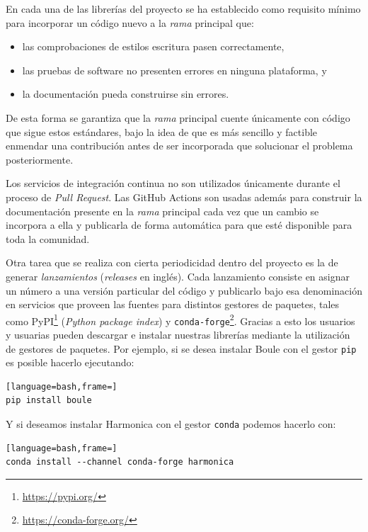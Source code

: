 En cada una de las librerías del proyecto se ha establecido como requisito
mínimo para incorporar un código nuevo a la \emph{rama} principal que:

\begin{itemize}
    \item las comprobaciones de estilos escritura pasen correctamente,
    \item las pruebas de software no presenten errores en ninguna plataforma, y
    \item la documentación pueda construirse sin errores.
\end{itemize}

De esta forma se garantiza que la \emph{rama} principal cuente únicamente con
código que sigue estos estándares, bajo la idea de que es más sencillo
y factible enmendar una contribución antes de ser incorporada que solucionar el
problema posteriormente.

Los servicios de integración continua no son utilizados únicamente durante el
proceso de \emph{Pull Request}.
Las GitHub Actions son usadas además para construir la documentación presente
en la \emph{rama} principal cada vez que un cambio se incorpora a ella
y publicarla de forma automática para que esté disponible para toda la
comunidad.

Otra tarea que se realiza con cierta periodicidad dentro del proyecto es la de
generar \emph{lanzamientos} (\emph{releases} en inglés).
Cada lanzamiento consiste en asignar un número a una versión particular del
código y publicarlo bajo esa denominación en servicios que proveen las fuentes
para distintos gestores de paquetes, tales como
PyPI\footnote{\url{https://pypi.org/}} (\emph{Python package index})
y \texttt{conda-forge}\footnote{\url{https://conda-forge.org/}}.
Gracias a esto los usuarios y usuarias pueden descargar e instalar nuestras
librerías mediante la utilización de gestores de paquetes.
Por ejemplo, si se desea instalar Boule con el gestor \texttt{pip} es posible
hacerlo ejecutando:

\begin{lstlisting}[language=bash,frame=]
pip install boule
\end{lstlisting}

\noindent Y si deseamos instalar Harmonica con el gestor \texttt{conda} podemos
hacerlo con:

\begin{lstlisting}[language=bash,frame=]
conda install --channel conda-forge harmonica
\end{lstlisting}


